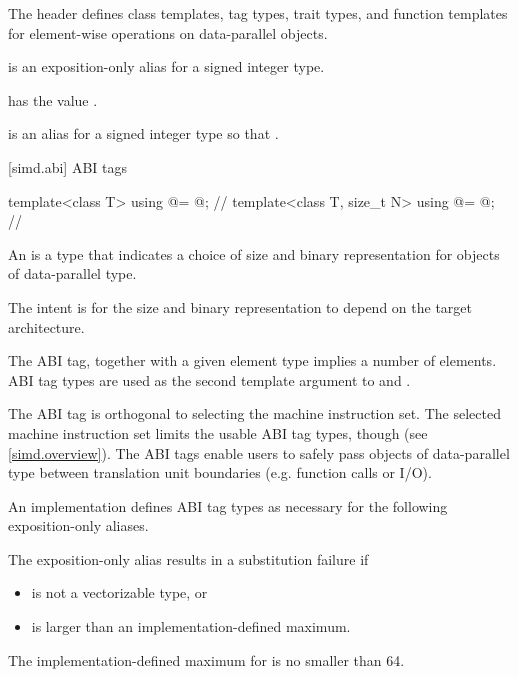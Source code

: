 \pnum
The header  defines class templates, tag types, trait types, and function templates for element-wise operations on data-parallel objects.

\pnum
\simdsizetype is an exposition-only alias for a signed integer type.

\pnum
{} has the value .

\pnum
{} is an alias for a signed integer type  so that .

[simd.abi]{ ABI tags}

\begin{codeblock}
template<class T> using @\nativeabi@ = @\seebelow@; // \expos
template<class T, size_t N> using @\deducet@ = @\seebelow@; // \expos
\end{codeblock}

\pnum
An  is a type that indicates a choice of size and binary
representation for objects of data-parallel type.
\begin{note}
  The intent is for the size and binary representation to depend on the target
  architecture.
\end{note}
The ABI tag, together with a given element type implies a number of elements.
ABI tag types are used as the second template argument to 
and .

\pnum
\begin{note}
The ABI tag is orthogonal to selecting the machine instruction set.
The selected machine instruction set limits the usable ABI tag types, though
(see \ref{simd.overview}).
The ABI tags enable users to safely pass objects of data-parallel type between
translation unit boundaries (e.g. function calls or I/O).
\end{note}

\pnum
An implementation defines ABI tag types as necessary for the following
exposition-only aliases.

\pnum
The exposition-only alias  results in a substitution
failure if
\begin{itemize}
  \item {} is not a vectorizable type, or
  \item {} is larger than an implementation-defined maximum.
\end{itemize}
The implementation-defined maximum for  is no smaller than 64.

